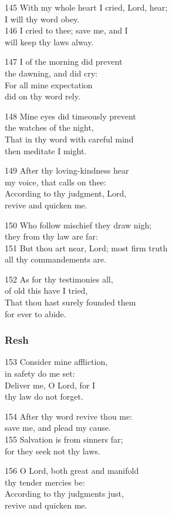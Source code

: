 145 With my whole heart I cried, Lord, hear;\\
I will thy word obey.\\
146 I cried to thee; save me, and I\\
will keep thy laws alway.

147 I of the morning did prevent\\
the dawning, and did cry:\\
For all mine expectation\\
did on thy word rely.

148 Mine eyes did timeously prevent\\
the watches of the night,\\
That in thy word with careful mind\\
then meditate I might.

149 After thy loving-kindness hear\\
my voice, that calls on thee:\\
According to thy judgment, Lord,\\
revive and quicken me.

150 Who follow mischief they draw nigh;\\
they from thy law are far:\\
151 But thou art near, Lord; most firm truth\\
all thy commandements are.

152 As for thy testimonies all,\\
of old this have I tried,\\
That thou hast surely founded them\\
for ever to abide.

\subsubsection*{Resh}

153 Consider mine affliction,\\
in safety do me set:\\
Deliver me, O Lord, for I\\
thy law do not forget.

154 After thy word revive thou me:\\
save me, and plead my cause.\\
155 Salvation is from sinners far;\\
for they seek not thy laws.

156 O Lord, both great and manifold\\
thy tender mercies be:\\
According to thy judgments just,\\
revive and quicken me.

